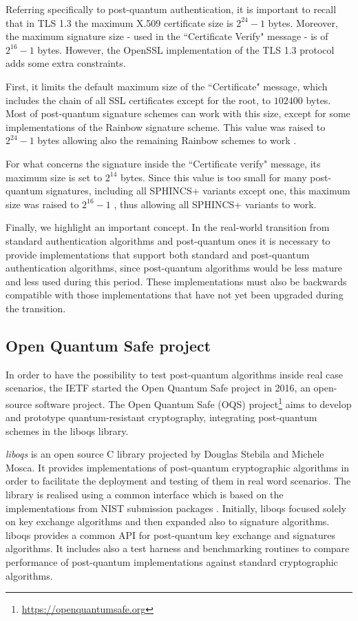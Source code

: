 \documentclass[a4paper,12pt]{article}
\begin{document}
Referring specifically to post-quantum authentication, it is important to recall that in TLS 1.3 the maximum X.509 certificate size is $2^{24} - 1$ bytes. Moreover, the maximum signature size - used in the ``Certificate Verify" message - is of $2^{16} - 1$ bytes.
However, the OpenSSL implementation of the TLS 1.3 protocol adds some extra constraints.

First, it limits the default maximum size of the ``Certificate" message, which includes the chain of all SSL certificates except for the root, to $102400$ bytes. Most of post-quantum signature schemes can work with this size, except for some implementations of the Rainbow signature scheme. This value was raised to $2^{24} - 1$ bytes allowing also the remaining Rainbow schemes to work \cite{6_NISTPQC_TLS_SSH}.

For what concerns the signature inside the ``Certificate verify" message, its maximum size is set to $2^{14}$ bytes.
Since this value is too small for many post-quantum signatures, including all SPHINCS+ variants except one, this maximum size was raised to $2^{16} - 1$ \cite{6_NISTPQC_TLS_SSH}, thus allowing all SPHINCS+ variants to work.

Finally, we highlight an important concept. In the real-world transition from standard authentication algorithms and post-quantum ones it is necessary to provide implementations that support both standard and post-quantum authentication algorithms, since post-quantum algorithms would be less mature and less used during this period. These implementations must also be backwards compatible with those implementations that have not yet been upgraded during the transition.

\subsection{Open Quantum Safe project}
\label{sub:openquantumsafeproject}

In order to have the possibility to test post-quantum algorithms inside real case scenarios, the IETF started the Open Quantum Safe project in 2016, an open-source software project.
The Open Quantum Safe (OQS) project\footnote{\url{https://openquantumsafe.org}} aims to develop and prototype quantum-resistant cryptography, integrating post-quantum schemes in the liboqs library.

\textit{liboqs} is an open source C library projected by Douglas Stebila and Michele Mosca. It provides implementations of post-quantum cryptographic algorithms in order to facilitate the deployment and testing of them in real word scenarios. The library is realised using a common interface which is based on the implementations from NIST submission packages \cite{16_Quantum}.
Initially, liboqs focused solely on key exchange algorithms and then expanded also to signature algorithms. liboqs provides a common API for post-quantum key exchange and signatures algorithms. It includes also a test harness and benchmarking routines to compare performance of post-quantum implementations against standard cryptographic algorithms.
\end{document}

